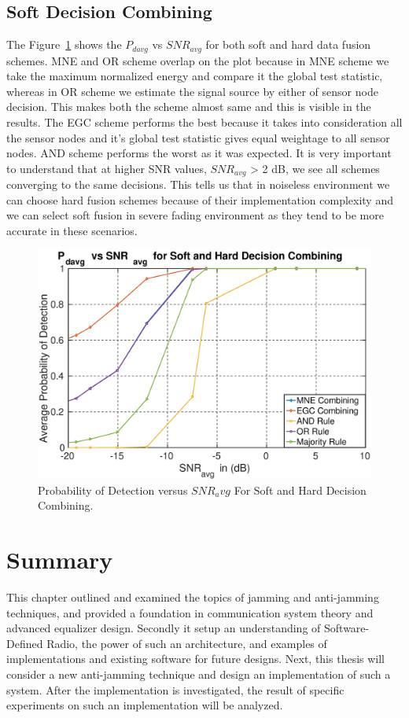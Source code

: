 \subsection{Soft Decision Combining}
The Figure~\ref{softpd} shows the $P_{davg}$ vs $SNR_{avg}$ for both soft and hard data fusion schemes. MNE and OR scheme overlap on the plot because in MNE scheme we take the maximum normalized energy and compare it the global test statistic, whereas in OR scheme we estimate the signal source by either of sensor node decision. This makes both the scheme almost same and this is visible in the results. The EGC scheme performs the best because it takes into consideration all the sensor nodes and it's global test statistic gives equal weightage to all sensor nodes. AND scheme performs the worst as it was expected. It is very important to understand that at higher SNR values, $SNR_{avg}$ > 2 dB, we see all schemes converging to the same decisions. This tells us that in noiseless environment we can choose hard fusion schemes because of their implementation complexity and we can select soft fusion in severe fading environment as they tend to be more accurate in these scenarios.
\begin{figure}[ht!]
	\centering
	\includegraphics[width=\textwidth,keepaspectratio]{images/Gill/figs/softnhardecisionpd.eps}
    \caption{Probability of Detection versus $SNR_avg$ For Soft and Hard Decision Combining.} 
\label{softpd}      
\end{figure}


\section{Summary}
This chapter outlined and examined the topics of jamming and anti-jamming techniques, and provided a foundation in communication system theory and advanced equalizer design.  Secondly it setup an understanding of Software-Defined Radio, the power of such an architecture, and examples of implementations and existing software for future designs.  Next, this thesis will consider a new anti-jamming technique and design an implementation of such a system.  After the implementation is investigated, the result of specific experiments on such an implementation will be analyzed.\\
